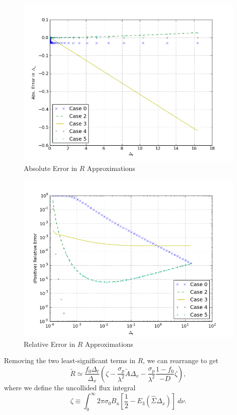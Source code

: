 \begin{figure}[H]
\centering
\includegraphics[width=0.7\linewidth]{graphics/numR_absErr}
\caption{Absolute Error in $R$ Approximations}
\label{numR_absErr}
\end{figure}

\begin{figure}[H]
\centering
\includegraphics[width=0.7\linewidth]{graphics/numR_relErr}
\caption{Relative Error in $R$ Approximations}
\label{numR_relErr}
\end{figure}
\noindent
Removing the two least-significant terms in $R$, we can rearrange to get
\begin{equation}
\tilde R\simeq\frac{f_0\Delta_t}{\Delta_x}\left(\zeta -
  \frac{\sigma_p}{\lambda^2}\tilde A\Delta_x - 
  \frac{\sigma_p}{\lambda^2}\frac{1-f_0}{-D}\zeta\right), \label{R approx}
\end{equation}
where we define the uncollided flux integral
\begin{equation}
\zeta\equiv\int_0^\infty 2\pi\sigma_0B_u\left[
  \frac{1}{2}-E_3(\hat\Sigma\Delta_x)\right]\ d\nu. \label{UncollidedFlux}
\end{equation}

\belowSubSecSkip


